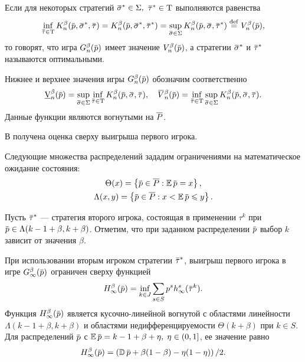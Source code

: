 Если для некоторых стратегий $\sigmav^* \in \Sigma,$ $\tauv^* \in \Tau$ выполняются равенства
\begin{equation*}
  \inf_{\tauv \in \Tau} \K(\p, \sigmav^*, \tauv) =
  \K(\p, \sigmav^*, \tauv^*) =
  \sup_{\sigmav \in \Sigma} \K(\p, \sigmav, \tauv^*) \eqdef
  \V(\p),
\end{equation*}
то говорят, что игра $\theG(\p)$ имеет значение $\V(\p)$, а стратегии $\sigmav^*$ и $\tauv^*$
называются оптимальными.

Нижнее и верхнее значения игры $\theG(\p)$ обозначим соответственно
\begin{equation*}
  \LowV(\p) =
    \sup_{\sigmav \in \Sigma}
    \inf_{\tauv \in \Tau}
    \K(\p, \sigmav, \tauv), \quad
  \HighV(\p) =
    \inf_{\tauv \in \Tau}
    \sup_{\sigmav \in \Sigma}
    \K(\p, \sigmav, \tauv).
\end{equation*}
Данные функции являются вогнутыми на $\overline{P}$.

В  получена оценка сверху выигрыша первого игрока.

Следующие множества распределений зададим ограничениями на математическое ожидание состояния:
\begin{gather*}
  \Theta(x) = \left\{ \p \in \MM: \E \p = x \right\}, \\
  \Lambda(x, y) = \left\{ \p \in \MM: x < \E \p \leqslant y \right\}.
\end{gather*}

Пусть $\tauv^*$ --- стратегия второго игрока, состоящая в применении $\tau^k$ при $\p \in \Lambda(k-1+\beta,k+\beta)$.
Отметим, что при заданном распределении $\p$ выбор $k$ зависит от значения $\beta$.

\begin{theorem}
  \label{ch2:upper-bound:theorem}
  При использовании вторым игроком стратегии $\tauv^*$, выигрыш первого игрока в игре
  $\theG[\infty](\p)$ ограничен сверху функцией
  \begin{equation*}
    \High(\p) = \inf_{k \in J} \sum_{s \in S} p^s  h^s_\infty(\tauv^k).
  \end{equation*}
  Функция $\High(\p)$ является кусочно-линейной вогнутой с областями линейности $\Lambda(k - 1 + \beta, k + \beta)$ и областями недифференцируемости $\Theta(k+\beta)$ при $k \in S$.
  Для распределений $\p$ с $\E \p = k - 1 + \beta + \eta, \; \eta \in (0, 1]$, ее значение равно
  \begin{equation}
    \label{ch2:upper-bound:eq:H(p)}
    \High(\p) = \left( \D \p + \beta(1-\beta) - \eta(1-\eta) \right)/2.
  \end{equation}
\end{theorem}

